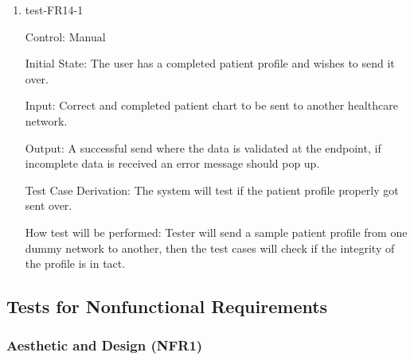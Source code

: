 \documentclass[12pt, titlepage]{article}
\begin{document}
\begin{enumerate}

\item{test-FR14-1} \label{test-FR14-1}

Control: Manual

Initial State: The user has a completed patient profile and wishes to send it over. 

Input: Correct and completed patient chart to be sent to another healthcare network.

Output: A successful send where the data is validated at the endpoint, if incomplete data is received an error message should pop up.

Test Case Derivation: The system will test if the patient profile properly got sent over.

How test will be performed: Tester will send a sample patient profile from one dummy network to another, then the test cases will check if the integrity of the profile is in tact.


\end{enumerate}

\subsection{Tests for Nonfunctional Requirements} \label{section:4.2}

\subsubsection{Aesthetic and Design (NFR1)} \label{section:4.2.1}
\end{document}
